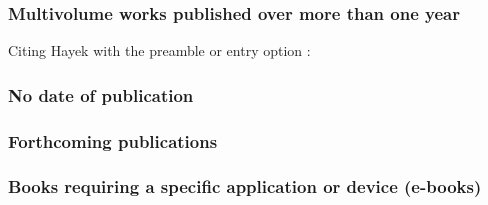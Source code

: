 \documentclass[11pt,letterpaper,oneside]{article}
\begin{document}
\setcounter{subsubsection}{143}
\subsubsection{Multivolume works published over more than one year}
\label{14.144}

\begin{citebib}
\item \cite[329]{hayek2011}
\item \cite{tillich1951}
\end{citebib}

\noindent Citing Hayek with the preamble or entry option
:

\begin{citebib}
\item \cite*[329]{hayek2011}
\end{citebib}

\subsubsection{No date of publication}

\begin{bibonly}
\nocite{boston,edinburgh1750,edinburgh}
\end{bibonly}

\subsubsection{Forthcoming publications}

\begin{citebib}
\item \cite{author}
\item \cite[345--46]{writer}
\item \cite{contributor}
\end{citebib}

\setcounter{subsubsection}{158}
\subsubsection{Books requiring a specific application or device (e-books)}

\begin{citebib}
\item \cite{borel2015}
\end{citebib}
\end{document}
